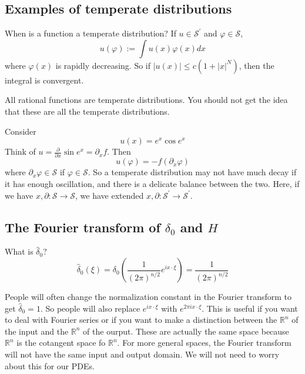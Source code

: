 \subsection{Examples of temperate distributions}
When is a function a temperate distribution? If $u \in \mathcal{S}^{\prime}$ and $\varphi \in \mathcal{S}$,
$$
u(\varphi):=\int u(x) \varphi(x) d x
$$
where $\varphi(x)$ is rapidly decreasing. So if $|u(x)| \leq c\left(1+|x|^{N}\right)$, then the integral is convergent.

\begin{example}
All rational functions are temperate distributions. You should not get the idea that these are all the temperate distributions.
\end{example}

\begin{example}
Consider
$$
u(x)=e^{x} \cos e^{x}
$$
Think of $u=\frac{\partial}{\partial x} \sin e^{x}=\partial_{x} f .$ Then
$$
u(\varphi)=-f\left(\partial_{x} \varphi\right)
$$
where $\partial_{x} \varphi \in \mathcal{S}$ if $\varphi \in \mathcal{S}$. So a temperate distribution may not have much decay if it has enough oscillation, and there is a delicate balance between the two.
Here, if we have $x, \partial: \mathcal{S} \rightarrow \mathcal{S}$, we have extended $x, \partial: \mathcal{S}^{\prime} \rightarrow \mathcal{S}^{\prime}$.
\end{example}

\subsection{The Fourier transform of $\delta_0$ and $H$}
What is $\widehat{\delta}_{0} ?$
$$
\widehat{\delta}_{0}(\xi)=\delta_{0}\left(\frac{1}{(2 \pi)^{n / 2}} e^{i x \cdot \xi}\right)=\frac{1}{(2 \pi)^{n / 2}}
$$

\begin{remark}
    People will often change the normalization constant in the Fourier transform to get $\widehat{\delta}_{0}=1$. So people will also replace $e^{i x \cdot \xi}$ with $e^{2 \pi i x \cdot \xi}$. This is useful if you want to deal with Fourier series or if you want to make a distinction between the $\mathbb{R}^{n}$ of the input and the $\mathbb{R}^{n}$ of the ourput. These are actually the same space because $\mathbb{R}^{n}$ is the cotangent space fo $\mathbb{R}^{n}$. For more general spaces, the Fourier transform will not have the same input and output domain. We will not need to worry about this for our PDEs.
\end{remark}

